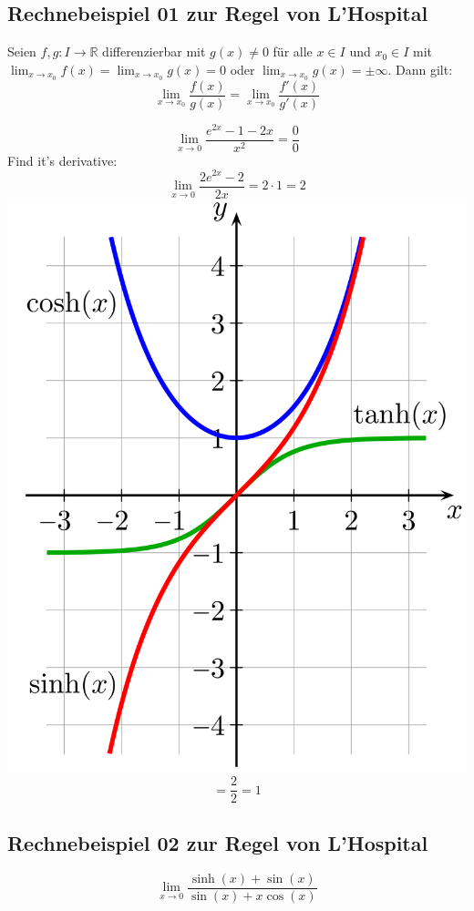 \documentclass{article}
\theoremstyle{mytheoremstyle}
\theoremstyle{mytheoremstyle}
\theoremstyle{myproblemstyle}
\begin{document}
\subsection{Rechnebeispiel 01 zur Regel von L'Hospital}
\begin{theorem}
    Seien $f,g: I \rightarrow \mathbb{R}$ differenzierbar mit $g(x) \not = 0$ für alle $x \in I$ und $x_0 \in I$ mit $\lim_{x \to x_0} f(x) = \lim_{x \to x_0} g(x) = 0$ oder $\lim_{x \to x_0} g(x) = \pm \infty$. Dann gilt:
    \[\lim_{x \to x_0} \frac{f(x)}{g(x)} = \lim_{x \to x_0} \frac{f'(x)}{g'(x)}\]
\end{theorem}

    \[\lim_{x \to 0} \frac{e ^ {2x}-1 - 2x}{x ^ {2}} = \frac{0}{0}\]
    Find it's derivative:
    \[\lim_{x \to 0} \frac{2e ^ {2x} - 2}{2x} = 2 \cdot 1 = 2\]
    \includegraphics[width = 10 cm]{1200px-Sinh+cosh+tanh.svg.png}
    \[= \frac{2}{2} = 1\]


\subsection{Rechnebeispiel 02 zur Regel von L'Hospital}
\[\lim_{x \to 0} \frac{\sinh (x) + \sin (x)}{\sin (x) + x\cos(x)}\]
\end{document}
